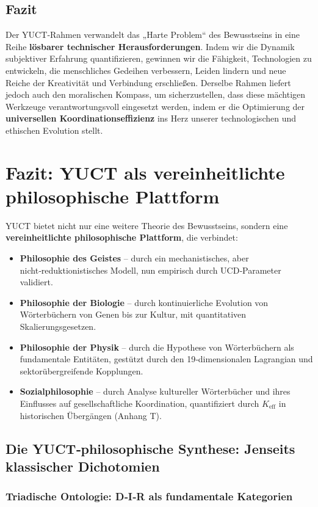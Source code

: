 \documentclass[12pt,a4paper]{article}
\newcommand{\eff}{\mathrm{eff}}
\newcommand{\Ke}{K_{\eff}}
\begin{document}
	\subsection{Fazit}
	Der YUCT‑Rahmen verwandelt das „Harte Problem“ des Bewusstseins in eine Reihe \textbf{lösbarer technischer Herausforderungen}. Indem wir die Dynamik subjektiver Erfahrung quantifizieren, gewinnen wir die Fähigkeit, Technologien zu entwickeln, die menschliches Gedeihen verbessern, Leiden lindern und neue Reiche der Kreativität und Verbindung erschließen. Derselbe Rahmen liefert jedoch auch den moralischen Kompass, um sicherzustellen, dass diese mächtigen Werkzeuge verantwortungsvoll eingesetzt werden, indem er die Optimierung der \textbf{universellen Koordinationseffizienz} ins Herz unserer technologischen und ethischen Evolution stellt.
	
	\section{Fazit: YUCT als vereinheitlichte philosophische Plattform}
	
	YUCT bietet nicht nur eine weitere Theorie des Bewusstseins, sondern eine \textbf{vereinheitlichte philosophische Plattform}, die verbindet:
	\begin{itemize}
		\item \textbf{Philosophie des Geistes} – durch ein mechanistisches, aber nicht‑reduktionistisches Modell, nun empirisch durch UCD‑Parameter validiert.
		\item \textbf{Philosophie der Biologie} – durch kontinuierliche Evolution von Wörterbüchern von Genen bis zur Kultur, mit quantitativen Skalierungsgesetzen.
		\item \textbf{Philosophie der Physik} – durch die Hypothese von Wörterbüchern als fundamentale Entitäten, gestützt durch den 19‑dimensionalen Lagrangian und sektorübergreifende Kopplungen.
		\item \textbf{Sozialphilosophie} – durch Analyse kultureller Wörterbücher und ihres Einflusses auf gesellschaftliche Koordination, quantifiziert durch $\Ke$ in historischen Übergängen (Anhang T).
	\end{itemize}
	
	\subsection{Die YUCT‑philosophische Synthese: Jenseits klassischer Dichotomien}
	
	\subsubsection{Triadische Ontologie: D‑I‑R als fundamentale Kategorien}
	
\end{document}
